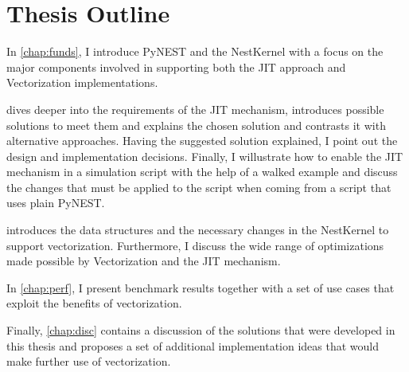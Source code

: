 \section{Thesis Outline}

In \autoref{chap:funds}, I introduce PyNEST and the NestKernel with a focus on the major components involved in supporting both the JIT approach and Vectorization implementations.

 dives deeper into the requirements of the JIT mechanism, introduces possible solutions to meet them and explains the chosen solution and contrasts it with alternative approaches. Having the suggested solution explained, I point out the design and implementation decisions. Finally, I willustrate how to enable the JIT mechanism in a simulation script with the help of a walked example and discuss the changes that must be applied to the script when coming from a script that uses plain PyNEST.

 introduces the data structures and the necessary changes in the NestKernel to support vectorization. Furthermore, I discuss the wide range of optimizations made possible by Vectorization and the JIT mechanism.

In \autoref{chap:perf}, I present benchmark results together with a set of use cases that exploit the benefits of vectorization.

Finally, \autoref{chap:disc} contains a discussion of the solutions that were developed in this thesis and proposes a set of additional implementation ideas that would make further use of vectorization.

\cleardoublepage
